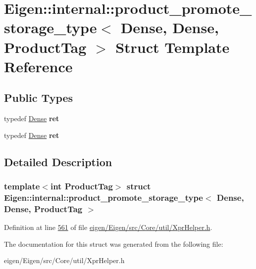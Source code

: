 \hypertarget{struct_eigen_1_1internal_1_1product__promote__storage__type_3_01_dense_00_01_dense_00_01_product_tag_01_4}{}\section{Eigen\+:\+:internal\+:\+:product\+\_\+promote\+\_\+storage\+\_\+type$<$ Dense, Dense, Product\+Tag $>$ Struct Template Reference}
\label{struct_eigen_1_1internal_1_1product__promote__storage__type_3_01_dense_00_01_dense_00_01_product_tag_01_4}
\subsection*{Public Types}
\begin{DoxyCompactItemize}
\item 
\mbox{\label{struct_eigen_1_1internal_1_1product__promote__storage__type_3_01_dense_00_01_dense_00_01_product_tag_01_4_a906505ffb186319872f7c08d884b2885}} 
typedef \hyperlink{struct_eigen_1_1_dense}{Dense} {\bfseries ret}
\item 
\mbox{\label{struct_eigen_1_1internal_1_1product__promote__storage__type_3_01_dense_00_01_dense_00_01_product_tag_01_4_a906505ffb186319872f7c08d884b2885}} 
typedef \hyperlink{struct_eigen_1_1_dense}{Dense} {\bfseries ret}
\end{DoxyCompactItemize}


\subsection{Detailed Description}
\subsubsection*{template$<$int Product\+Tag$>$\newline
struct Eigen\+::internal\+::product\+\_\+promote\+\_\+storage\+\_\+type$<$ Dense, Dense, Product\+Tag $>$}



Definition at line \hyperlink{eigen_2_eigen_2src_2_core_2util_2_xpr_helper_8h_source_l00561}{561} of file \hyperlink{eigen_2_eigen_2src_2_core_2util_2_xpr_helper_8h_source}{eigen/\+Eigen/src/\+Core/util/\+Xpr\+Helper.\+h}.



The documentation for this struct was generated from the following file\+:\begin{DoxyCompactItemize}
\item 
eigen/\+Eigen/src/\+Core/util/\+Xpr\+Helper.\+h\end{DoxyCompactItemize}
